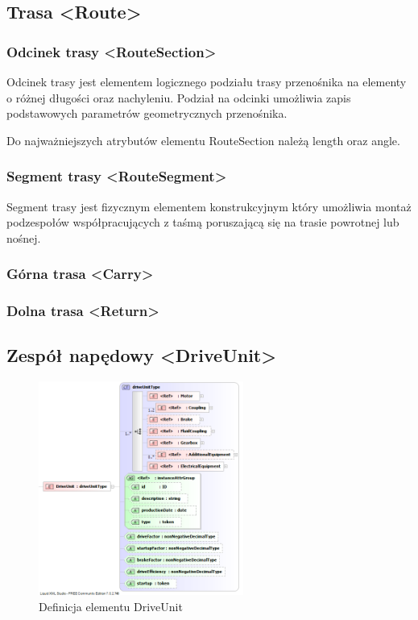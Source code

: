 \documentclass[12pt,a4paper]{article}
\begin{document}
\subsection{Trasa <Route>}


\subsubsection{Odcinek trasy <RouteSection>}
Odcinek trasy jest elementem logicznego podziału trasy przenośnika na elementy o
różnej długości oraz nachyleniu. Podział na odcinki umożliwia zapis podstawowych
parametrów geometrycznych przenośnika.

Do najważniejszych atrybutów elementu RouteSection należą length oraz angle.


\subsubsection{Segment trasy <RouteSegment>}
Segment trasy jest fizycznym elementem konstrukcyjnym który umożliwia montaż
podzespołów współpracujących z taśmą poruszającą się na trasie powrotnej lub
nośnej.

\subsubsection{Górna trasa <Carry>}


\subsubsection{Dolna trasa <Return>}


\subsection{Zespół napędowy <DriveUnit>}

\begin{figure}[h]
  \centering
  \includegraphics[width=0.6\textwidth]{png/liquid/DriveUnit}
  \caption{Definicja elementu DriveUnit}
  \label{fig:driveUnit-xsd}
\end{figure}
\end{document}

